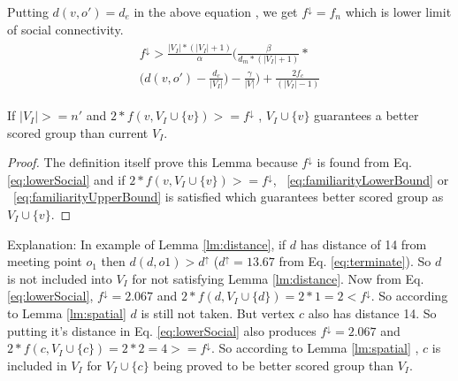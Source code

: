 \documentclass{vldb}
\begin{document}
			
			
			
		 Putting $  d(v,o')=d_{e} $ in the above equation , we get  $ f^\downarrow = f_{n} $ which is   lower limit of social connectivity.	
			\begin{equation}
			\label{eq:lowerSocial} 
			\begin{aligned}
			\begin{split}
				f^\downarrow >
					\frac{|V_I|*(|V_I|+1)}{\alpha}
					\Bigg(\frac{\beta}{d_m*(|V_I|+1)}*
					\\
					\bigg(d(v,o')-\frac{d_c}{|V_I|}\bigg)-\frac{\gamma}{|V|}\Bigg)+\frac{2f_c}{(|V_I|-1)}
			\end{split}
			\end{aligned}
			\end{equation}
				 
	
		 
		 \begin{Lemma}
		 	\label{lm:spatial}
		 	If $ |V_I|>=n'$ and $ 2*f(v,V_I \cup \{v\}) >=f^\downarrow $ , $ V_I \cup \{v\} $ guarantees a better scored group than current $ V_I $. 
		 \end{Lemma}
		 \begin{proof}
		 The definition itself prove this Lemma because $ f^\downarrow $ is found from Eq.\eqref{eq:lowerSocial} and if   $ 2*f(v,V_I \cup \{v\}) >=f^\downarrow $, ~\ref{eq:familiarityLowerBound} or ~\ref{eq:familiarityUpperBound} is satisfied which guarantees better scored group as  $ V_I \cup \{v\} $. 
		 \end{proof}
		 
		
		Explanation: In example of Lemma \ref{lm:distance}, if $ d $ has distance of 14 from meeting point $ o_{1} $ then $ d(d,o1)> d^\uparrow $ ($ d^\uparrow=13.67 $ from Eq. \eqref{eq:terminate}). So $ d $ is not included into $ V_I $ for not satisfying Lemma \ref{lm:distance}. Now from Eq. \eqref{eq:lowerSocial}, $ f^\downarrow =2.067$ and $ 2*f(d,V_I \cup \{d\})= 2*1=2 < f^\downarrow $. So according to Lemma \ref{lm:spatial}  $ d  $ is still not taken. But vertex    $ c $ also has distance 14. So putting it's distance in Eq. \eqref{eq:lowerSocial} also produces $ f^\downarrow =2.067$ and $ 2*f(c,V_I \cup \{c\})= 2*2=4 >= f^\downarrow $. So according to Lemma \ref{lm:spatial} , $ c $ is included in $ V_I $ for $ V_I \cup \{c\} $ being proved to be better scored group than $ V_I $.
			
	 	
		
		
		
\end{document}
